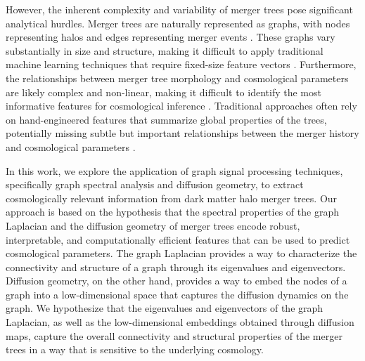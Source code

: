 \documentclass[twocolumn]{aastex631}
\begin{document}
However, the inherent complexity and variability of merger trees pose significant analytical hurdles. Merger trees are naturally represented as graphs, with nodes representing halos and edges representing merger events \citep{parkinson2007generatingdarkmatterhalo,robles2022deeplearningapproachhalo}. These graphs vary substantially in size and structure, making it difficult to apply traditional machine learning techniques that require fixed-size feature vectors \citep{robles2022deeplearningapproachhalo}. Furthermore, the relationships between merger tree morphology and cosmological parameters are likely complex and non-linear, making it difficult to identify the most informative features for cosmological inference \citep{geda2025constructingmergertreesdensity}. Traditional approaches often rely on hand-engineered features that summarize global properties of the trees, potentially missing subtle but important relationships between the merger history and cosmological parameters \citep{parkinson2007generatingdarkmatterhalo,jung2024mergertreebasedgalaxymatching}.

In this work, we explore the application of graph signal processing techniques, specifically graph spectral analysis and diffusion geometry, to extract cosmologically relevant information from dark matter halo merger trees. Our approach is based on the hypothesis that the spectral properties of the graph Laplacian and the diffusion geometry of merger trees encode robust, interpretable, and computationally efficient features that can be used to predict cosmological parameters. The graph Laplacian provides a way to characterize the connectivity and structure of a graph through its eigenvalues and eigenvectors. Diffusion geometry, on the other hand, provides a way to embed the nodes of a graph into a low-dimensional space that captures the diffusion dynamics on the graph. We hypothesize that the eigenvalues and eigenvectors of the graph Laplacian, as well as the low-dimensional embeddings obtained through diffusion maps, capture the overall connectivity and structural properties of the merger trees in a way that is sensitive to the underlying cosmology.
\end{document}
